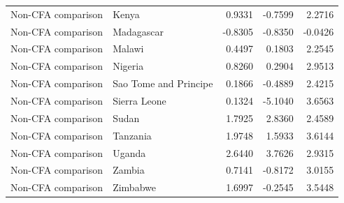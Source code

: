 \begin{table}
\begin{tabular}[t]{llrrr}
Non-CFA comparison & Kenya & 0.9331 & -0.7599 & 2.2716\\
\addlinespace
Non-CFA comparison & Madagascar & -0.8305 & -0.8350 & -0.0426\\
Non-CFA comparison & Malawi & 0.4497 & 0.1803 & 2.2545\\
Non-CFA comparison & Nigeria & 0.8260 & 0.2904 & 2.9513\\
Non-CFA comparison & Sao Tome and Principe & 0.1866 & -0.4889 & 2.4215\\
Non-CFA comparison & Sierra Leone & 0.1324 & -5.1040 & 3.6563\\
\addlinespace
Non-CFA comparison & Sudan & 1.7925 & 2.8360 & 2.4589\\
Non-CFA comparison & Tanzania & 1.9748 & 1.5933 & 3.6144\\
Non-CFA comparison & Uganda & 2.6440 & 3.7626 & 2.9315\\
Non-CFA comparison & Zambia & 0.7141 & -0.8172 & 3.0155\\
Non-CFA comparison & Zimbabwe & 1.6997 & -0.2545 & 3.5448\\
\bottomrule
\end{tabular}
\end{table}